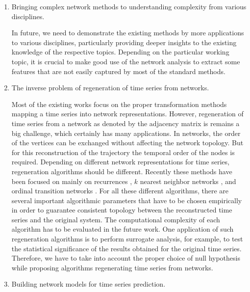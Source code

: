 \begin{enumerate}
		\item Bringing complex network methods to understanding complexity from various disciplines. 

	In future, we need to demonstrate the existing methods by more applications to various disciplines, particularly providing deeper insights to the existing knowledge of the respective topics. Depending on the particular working topic, it is crucial to make good use of the network analysis to extract some features that are not easily captured by most of the standard methods. 


		\item The inverse problem of regeneration of time series from networks. 

	Most of the existing works focus on the proper transformation methods mapping a time series into network representations. However, regeneration of time series from a network as denoted by the adjacency matrix is remains a big challenge, which certainly has many applications. In networks, the order of the vertices can be exchanged without affecting the network topology. But for this reconstruction of the trajectory the temporal order of the nodes is required. Depending on different network representations for time series, regeneration algorithms should be different. Recently these methods have been focused on mainly on recurrences \cite{thiel2004b,hirata2008,Hirata2016}, $k$ nearest neighbor networks \cite{Hou2015,Khor2016}, and ordinal transition networks \cite{McCullough2017}. For all these different algorithms, there are several important algorithmic parameters that have to be chosen empirically in order to guarantee consistent topology between the reconstructed time series and the original system. The computational complexity of each algorithm has to be evaluated in the future work. One application of such regeneration algorithms is to perform surrogate analysis, for example, to test the statistical significance of the results obtained for the original time series. Therefore, we have to take into account the proper choice of null hypothesis while proposing algorithms regenerating time series from networks. 


		\item Building network models for time series prediction. 


\end{enumerate}
